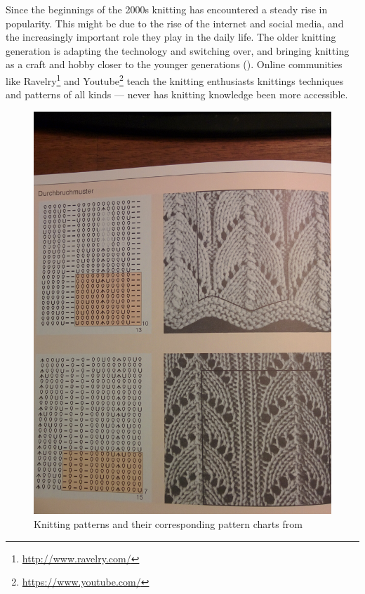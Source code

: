 Since the beginnings of the 2000s knitting has encountered a steady rise in popularity. This might be due to the rise of the internet and social media, and the increasingly important role they play in the daily life. The older knitting generation is adapting the technology and switching over, and bringing knitting as a craft and hobby closer to the younger generations (\cite{lewis_rise_of_knitting}). Online communities like Ravelry\footnote{\url{http://www.ravelry.com/}} and Youtube\footnote{\url{https://www.youtube.com/}} teach the knitting enthusiasts knittings techniques and patterns of all kinds --- never has knitting knowledge been more accessible.

\begin{figure}
    \includegraphics[width=1\linewidth]{images/knitting_pattern_chart_book.JPG}
   \caption[{Knitting patterns and their corresponding pattern charts \protect{}}]{Knitting patterns and their corresponding pattern charts from \protect\cite[p142]{Natter1983}}
\end{figure}

